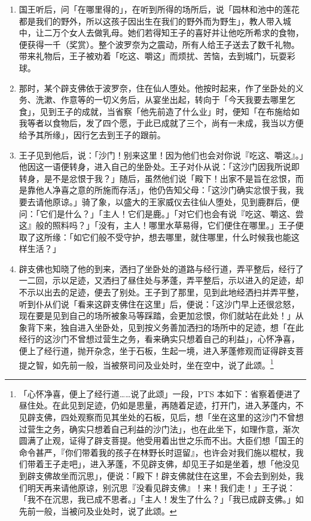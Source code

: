 \begin{enumerate}
\item 国王听后，问「在哪里得的」，在听到所得的场所后，说「园林和池中的莲花都是我们的野外，所以这孩子因出生在我们的野外而为野生」，教人带入城中，让二万个女人去做乳母。她们若得知王子的喜好并让他吃所希求的食物，便获得一千（奖赏）。整个波罗奈为之震动，所有人给王子送去了数千礼物。带来礼物后，王子被劝着「吃这、嚼这」而烦扰、苦恼，去到城门，玩耍彩球。
\item 那时，某个辟支佛依于波罗奈，住在仙人堕处。他按时起来，作了坐卧处的义务、洗漱、作意等的一切义务后，从宴坐出起，转向于「今天我要去哪里乞食」，见到王子的成就，当省察「他先前造了什么业」时，便知「在布施给如我等者以食物后，发了四个愿，于此已成就了三个，尚有一未成，我当以方便给予其所缘」，因行乞去到王子的跟前。
\item 王子见到他后，说：「沙门！别来这里！因为他们也会对你说『吃这、嚼这』。」他因这一语便转身，进入自己的坐卧处。王子对仆从说：「这沙门因我所说即转身，是不是忿恨于我？」随后，虽然他们说「殿下！出家不是旨在忿恨，而是靠他人净喜之意的所施而存活」，他仍告知父母：「这沙门确实忿恨于我，我要去请他原谅。」骑了象，以盛大的王家威仪去往仙人堕处，见到鹿群后，便问：「它们是什么？」「主人！它们是鹿。」「对它们也会有说『吃这、嚼这、尝这』般的照料吗？」「没有，主人！哪里水草易得，它们便住在哪里。」王子便取了这所缘：「如它们般不受守护，想去哪里，就住哪里，什么时候我也能这样生活？」
\item 辟支佛也知晓了他的到来，洒扫了坐卧处的道路与经行道，弄平整后，经行了一二回，示以足迹，又洒扫了昼住处与茅蓬，弄平整后，示以进入的足迹，却不示以出去的足迹，便去了别处。王子到了那里，见到此地经洒扫并弄平整，听到仆从们说「看来这辟支佛住在这里」后，便说：「这沙门早上还很忿怒，现在要是见到自己的场所被象马等踩踏，会更加忿恨，你们就站在此处！」从象背下来，独自进入坐卧处，见到按义务善加洒扫的场所中的足迹，想「在此经行的这沙门不曾想过营生之务，看来确实只想着自己的利益」，心怀净喜，便上了经行道，抛开杂念，坐于石板，生起一境，进入茅蓬修观而证得辟支菩提之智，如先前一般，当被祭司问及业处时，坐在空中，说了此颂。\footnote{「心怀净喜，便上了经行道……说了此颂」一段，PTS 本如下：省察着便进了昼住处。在此见到足迹，仍如是思量，再随着足迹，打开门，进入茅蓬内，不见辟支佛，四处观察而见其坐处的石板，见后，想「坐在这里的这沙门不曾想过营生之务，确实只想着自己利益的沙门法」，也在此坐下，如理作意，渐次圆满了止观，证得了辟支菩提。他受用着出世之乐而不出。大臣们想「国王的命令甚严，『你们带着我的孩子在林野长时逗留』，也许会对我们施以棍杖，我们带着王子走吧」，进入茅蓬，不见辟支佛，却见王子如是坐着，想「他没见到辟支佛故坐而沉思」，便说：「殿下！辟支佛就住在这里，不会去到别处，我们明天再来请他原谅，别沉思『没看见辟支佛』！来！我们走！」王子说：「我不在沉思，我已成不思者。」「主人！发生了什么？」「我已成辟支佛。」如先前一般，当被问及业处时，说了此颂。}

\end{enumerate}
